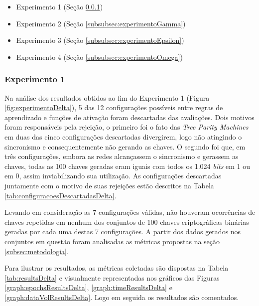 \documentclass[12pt]{article}
\newcommand{\bits}{\textit{bits}\xspace}
\begin{document}
            \begin{itemize}
                \item Experimento 1 (Seção \ref{subsubsec:experimentoDelta})
                \item Experimento 2 (Seção \ref{subsubsec:experimentoGamma})
                \item Experimento 3 (Seção \ref{subsubsec:experimentoEpsilon})
                \item Experimento 4 (Seção \ref{subsubsec:experimentoOmega})
            \end{itemize}

            \subsubsection{Experimento 1}
            \label{subsubsec:experimentoDelta}

                Na análise dos resultados obtidos ao fim do Experimento 1 (Figura \ref{fig:experimentoDelta}), 5 das 12 configurações possíveis entre regras de aprendizado e funções de ativação foram descartadas das avaliações. Dois motivos foram responsáveis pela rejeição, o primeiro foi o fato das \textit{Tree Parity Machines} em duas das cinco configurações descartadas divergirem, logo não atingindo o sincronismo e consequentemente não gerando as chaves. O segundo foi que, em três configurações, embora as redes alcançassem o sincronismo e gerassem as chaves, todas as 100 chaves geradas eram iguais com todos os 1.024 \bits em 1 ou em 0, assim inviabilizando sua utilização. As configurações descartadas juntamente com o motivo de suas rejeições estão descritos na Tabela \ref{tab:configuracoesDescartadasDelta}.

                
            
                Levando em consideração as 7 configurações válidas, não houveram ocorrências de chaves repetidas em nenhum dos conjuntos de 100 chaves criptográficas binárias geradas por cada uma destas 7 configurações. A partir dos dados gerados nos conjuntos em questão foram analisadas as métricas propostas na seção \ref{subsec:metodologia}.
                
                Para ilustrar os resultados, as métricas coletadas são dispostas na Tabela \ref{tab:resultsDelta} e visualmente representadas nos gráficos das Figuras \ref{graph:epochsResultsDelta}, \ref{graph:timeResultsDelta} e \ref{graph:dataVolResultsDelta}. Logo em seguida os resultados são comentados. 
                
\end{document}
